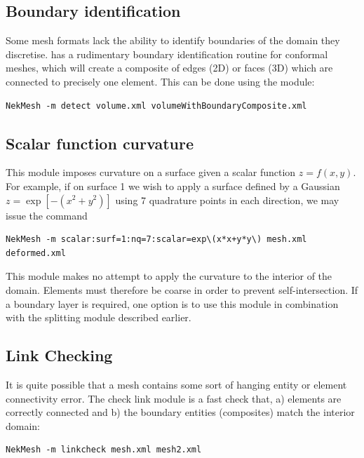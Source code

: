 \subsection{Boundary identification}

Some mesh formats lack the ability to identify boundaries of the domain they
discretise. \nm has a rudimentary boundary identification routine for conformal
meshes, which will create a composite of edges (2D) or faces (3D) which are
connected to precisely one element. This can be done using the 
module:

\begin{lstlisting}[style=BashInputStyle]
  NekMesh -m detect volume.xml volumeWithBoundaryComposite.xml
\end{lstlisting}

\subsection{Scalar function curvature}

This module imposes curvature on a surface given a scalar function
$z=f(x,y)$. For example, if on surface 1 we wish to apply a surface defined by a
Gaussian $z = \exp[-(x^2+y^2)]$ using 7 quadrature points in each direction, we
may issue the command

\begin{lstlisting}[style=BashInputStyle]
  NekMesh -m scalar:surf=1:nq=7:scalar=exp\(x*x+y*y\) mesh.xml deformed.xml
\end{lstlisting}

\begin{notebox}
  This module makes no attempt to apply the curvature to the interior of the
  domain. Elements must therefore be coarse in order to prevent
  self-intersection. If a boundary layer is required, one option is to use this
  module in combination with the splitting module described earlier.
\end{notebox}

\subsection{Link Checking}

It is quite possible that a mesh contains some sort of hanging entity or
element connectivity error. The check link module is a fast check that, a)
elements are correctly connected and b) the boundary entities (composites)
match the interior domain:

\begin{lstlisting}[style=BashInputStyle]
  NekMesh -m linkcheck mesh.xml mesh2.xml
\end{lstlisting}

